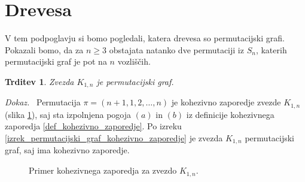 \documentclass[a4paper, 12pt]{book}
\newtheorem{trditev}{Trditev}[chapter]
\newenvironment{dokaz}{\emph{Dokaz.}\ }{\hspace{\fill}{$\Box$}}
\begin{document}
\section{ Drevesa }

V tem podpoglavju si bomo pogledali, katera drevesa so permutacijski grafi. Pokazali bomo, da za $n \geq 3$ obstajata natanko dve permutaciji iz $S_n$, katerih permutacijski graf je pot na $n$ vozliščih.

\begin{trditev}
\label{trditev_zvezde_permutacijski_graf}
    Zvezda $K_{1,n}$ je permutacijski graf.
\end{trditev}
\begin{dokaz}
    Permutacija $\pi = (n+1, 1, 2, \dots, n)$ je kohezivno zaporedje zvezde $K_{1, n}$ (slika \ref{graf_kohezivnega_zaporedja_zvezda}), saj sta izpolnjena pogoja $(a)$ in $(b)$ iz definicije kohezivnega zaporedja \ref{def_kohezivno_zaporedje}. Po izreku \ref{izrek_permutacijski_graf_kohezivno_zaporedje} je zvezda $K_{1, n}$ permutacijski graf, saj ima kohezivno zaporedje.
\end{dokaz}

\begin{figure}[h]
    \begin{center}        
    \end{center}
    \caption{Primer kohezivnega zaporedja za zvezdo $K_{1, n}$.}
    \label{graf_kohezivnega_zaporedja_zvezda}
\end{figure}
\end{document}
